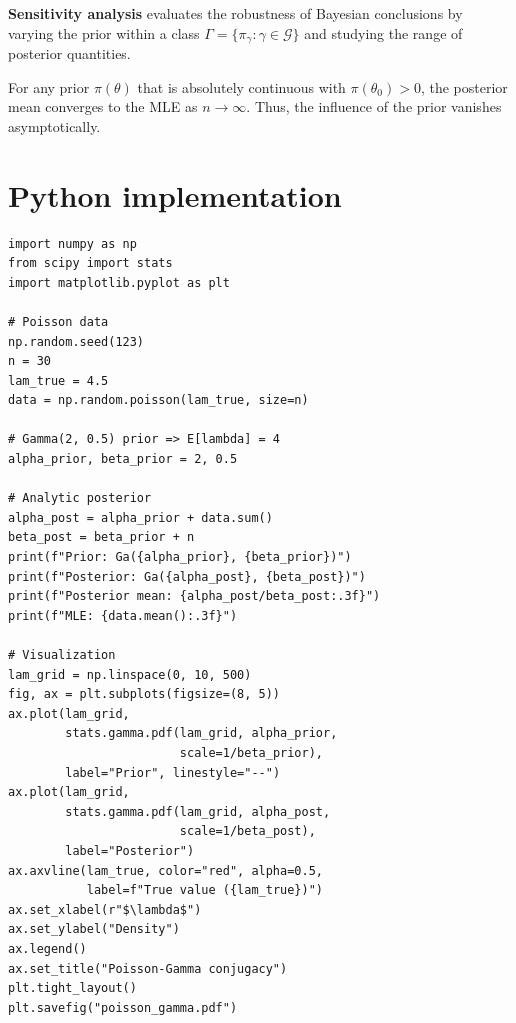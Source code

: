 \begin{definition}
\textbf{Sensitivity analysis} evaluates the robustness of Bayesian
conclusions by varying the prior within a class
$\Gamma = \{\pi_\gamma : \gamma \in \mathcal{G}\}$ and studying
the range of posterior quantities.
\end{definition}

\begin{proposition}
For any prior $\pi(\theta)$ that is absolutely continuous with
$\pi(\theta_0) > 0$, the posterior mean converges to the MLE as
$n \to \infty$. Thus, the influence of the prior vanishes
asymptotically.
\end{proposition}

\section{Python implementation}

\begin{codeblock}[title=\textbf{Poisson--Gamma conjugacy}]
\begin{verbatim}
import numpy as np
from scipy import stats
import matplotlib.pyplot as plt

# Poisson data
np.random.seed(123)
n = 30
lam_true = 4.5
data = np.random.poisson(lam_true, size=n)

# Gamma(2, 0.5) prior => E[lambda] = 4
alpha_prior, beta_prior = 2, 0.5

# Analytic posterior
alpha_post = alpha_prior + data.sum()
beta_post = beta_prior + n
print(f"Prior: Ga({alpha_prior}, {beta_prior})")
print(f"Posterior: Ga({alpha_post}, {beta_post})")
print(f"Posterior mean: {alpha_post/beta_post:.3f}")
print(f"MLE: {data.mean():.3f}")

# Visualization
lam_grid = np.linspace(0, 10, 500)
fig, ax = plt.subplots(figsize=(8, 5))
ax.plot(lam_grid,
        stats.gamma.pdf(lam_grid, alpha_prior,
                        scale=1/beta_prior),
        label="Prior", linestyle="--")
ax.plot(lam_grid,
        stats.gamma.pdf(lam_grid, alpha_post,
                        scale=1/beta_post),
        label="Posterior")
ax.axvline(lam_true, color="red", alpha=0.5,
           label=f"True value ({lam_true})")
ax.set_xlabel(r"$\lambda$")
ax.set_ylabel("Density")
ax.legend()
ax.set_title("Poisson-Gamma conjugacy")
plt.tight_layout()
plt.savefig("poisson_gamma.pdf")
\end{verbatim}
\end{codeblock}


